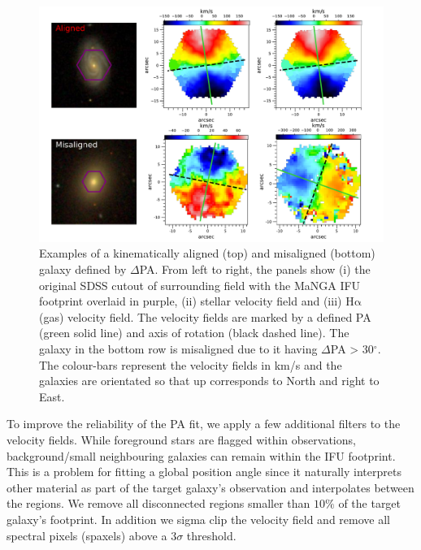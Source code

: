 \begin{figure}
    \centering
	\includegraphics[width=0.8\linewidth]{thesis/latex/misalignment_MaNGA/cutout_wIFU_revised.pdf}
    \caption[Examples of a kinematically aligned (top) and misaligned (bottom) galaxy defined by $\Delta$PA.]{Examples of a kinematically aligned (top) and misaligned (bottom) galaxy defined by $\Delta$PA. From left to right, the panels show (i) the original SDSS cutout of surrounding field with the MaNGA IFU footprint overlaid in purple, (ii) stellar velocity field and (iii) $\mathrm{H\alpha}$ (gas) velocity field. The velocity fields are marked by a defined PA (green solid line) and axis of rotation (black dashed line). The galaxy in the bottom row is misaligned due to it having $\Delta$PA > 30$^{\circ}$. The colour-bars represent the velocity fields in km/s and the galaxies are orientated so that up corresponds to North and right to East.}
    \label{fig:cutout_wIFU}
\end{figure}

To improve the reliability of the PA fit, we apply a few additional filters to the velocity fields. While foreground stars are flagged within observations, background/small neighbouring galaxies can remain within the IFU footprint. This is a problem for fitting a global position angle since it naturally interprets other material as part of the target galaxy's observation and interpolates between the regions. We remove all disconnected regions smaller than $10\%$ of the target galaxy's footprint. In addition we sigma clip the velocity field and remove all spectral pixels (spaxels) above a $3\sigma$ threshold.

